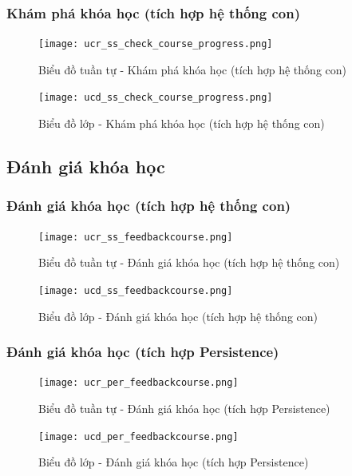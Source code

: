 \documentclass[./../main.tex]{subfiles}
\begin{document}
\subsubsection{Khám phá khóa học (tích hợp hệ thống con)}
\begin{figure}[H]
    \centering
    \texttt{[image: ucr\_ss\_check\_course\_progress.png]}
    \caption{Biểu đồ tuần tự - Khám phá khóa học (tích hợp hệ thống con)}
\end{figure}
\begin{figure}[H]
    \centering
    \texttt{[image: ucd\_ss\_check\_course\_progress.png]}
    \caption{Biểu đồ lớp - Khám phá khóa học (tích hợp hệ thống con)}
\end{figure}

\subsection{Đánh giá khóa học}
\subsubsection{Đánh giá khóa học (tích hợp hệ thống con)}
\begin{figure}[H]
    \centering
    \texttt{[image: ucr\_ss\_feedbackcourse.png]}
    \caption{Biểu đồ tuần tự - Đánh giá khóa học (tích hợp hệ thống con)}
\end{figure}
\begin{figure}[H]
    \centering
    \texttt{[image: ucd\_ss\_feedbackcourse.png]}
    \caption{Biểu đồ lớp - Đánh giá khóa học (tích hợp hệ thống con)}
\end{figure}
\subsubsection{Đánh giá khóa học (tích hợp Persistence)}
\begin{figure}[H]
    \centering
    \texttt{[image: ucr\_per\_feedbackcourse.png]}
    \caption{Biểu đồ tuần tự - Đánh giá khóa học (tích hợp Persistence)}
\end{figure}
\begin{figure}[H]
    \centering
    \texttt{[image: ucd\_per\_feedbackcourse.png]}
    \caption{Biểu đồ lớp - Đánh giá khóa học (tích hợp Persistence)}
\end{figure}
\end{document}

